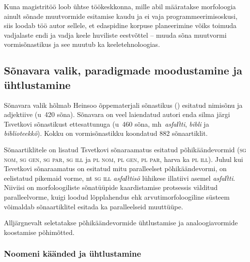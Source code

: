 \documentclass[12pt,a4paper]{article}
\newcommand{\vadja}[1]{\textit{#1}}
\newcommand{\msd}[1]{\textsc{#1}}
\begin{document}
Kuna magistritöö loob ühtse töökeskkonna, mille abil määratakse morfoloogia ainult sõnade muut\-vormide esitamise kaudu ja ei vaja programmeerimis\-oskusi, siis loodab töö autor sellele, et edaspidine korpuse planeerimine võiks toimuda vadjalaste endi ja vadja keele huviliste eestvõttel -- muuda sõna muutvormi vormi\-sõnastikus ja see muutub ka keele\-tehnoloogias.



\subsection{Sõnavara valik, paradigmade moodustamine ja ühtlustamine}
\label{sec:sõnavara-valik}

Sõnavara valik hõlmab Heinsoo õppematerjali sõnastikus (\citeyear{heinsoo_vaddsonakopittoja_2015}) esitatud nimi\-sõnu ja adjektiive (u~420 sõna). Sõnavara on veel laiendatud autori enda silma järgi Tsvetkovi sõnastikust ettesattunuga (u~460 sõna, mh~\vadja{asfal̕tti}, \vadja{bibli} ja \vadja{biblioteekkõ}). Kokku on vormi\-sõnastikku koondatud 882 sõna\-artiklit.

Sõnaartiklitele on lisatud Tsvetkovi sõnaraamatus esitatud põhi\-käände\-vormid (\msd{sg nom}, \msd{sg gen}, \msd{sg par}, \msd{sg ill} ja  \msd{pl nom}, \msd{pl gen}, \msd{pl par}, harva ka \msd{pl ill}). Juhul kui Tsvetkovi sõna\-raamatus on esitatud mitu paralleelset põhikäändevormi, on eelistatud pikemaid vorme, nt \msd{sg ill} \vadja{asfal̕ttisõ} lühikese illatiivi asemel \vadja{asfal̕tti}. Niiviisi on morfoloogiliste sõnatüüpide kaardistamise protsessis välditud paralleelvorme, kuigi loodud lõpplahendus ehk arvutimorfoloogiline süsteem võimaldab sõna\-artiklitel esitada ka paralleelseid muuttüüpe. %


Alljärgnevalt seletatakse põhikäändevormide ühtlustamise ja analoogiavormide koostamise põhimõtted. %


\subsubsection{Noomeni käänded ja ühtlustamine}
\end{document}
